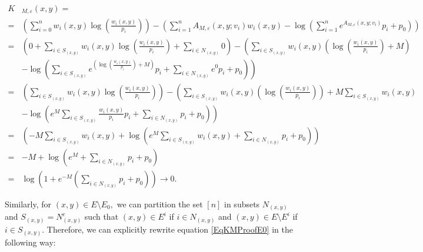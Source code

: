 \documentclass[12pt,twoside,a4paper]{article}
\newcommand{\lep}{\left(}
\newcommand{\rip}{\right)}
\begin{document}
\begin{align*}
    K&_{M,\varepsilon}(x,y)=\\
    =&\left(\sum^n_{i=0} w_i(x,y) \log \left(\frac{w_i(x,y)}{p_i}\right)\right) -\left(\sum^n_{i=1}A_{M,\varepsilon}(x,y;v_i)w_i(x,y)-\log\lep\sum^n_{i=1}e^{A_{M,\varepsilon}(x,y;v_i)}p_i+p_0\rip\right)\\
 =&\left(0+\sum_{i\in S_{(x,y)}}w_i(x,y) \log \left(\frac{w_i(x,y)}{p_i}\right)+\sum_{i\in N_{(x,y)}}0\right)-\left(\sum_{i\in S_{(x,y)}}w_i(x,y) \left(\log \left(\frac{w_i(x,y)}{p_i}\right)+M\right)\right.\\
    &\left. -\log\lep\sum_{i\in S_{(x,y)}}e^{\left(\log \left(\frac{w_i(x,y)}{p_i}\right)+M\right)}p_i+\sum_{i\in N_{(x,y)}}e^0p_i+p_0\rip\right)\\
 =&\left(\sum_{i\in S_{(x,y)}}w_i(x,y) \log \left(\frac{w_i(x,y)}{p_i}\right)\right) -\left(\sum_{i\in S_{(x,y)}}w_i(x,y) \left(\log \left(\frac{w_i(x,y)}{p_i}\right)\right)+M\sum_{i\in S_{(x,y)}}w_i(x,y)\right.\\
    &-\left.\log(e^M\sum_{i\in S_{(x,y)}}\frac{w_i(x,y)}{p_i}p_i+\sum_{i\in N_{(x,y)}}p_i+p_0)\right)\\
    =&\left(-M\sum_{i\in S_{(x,y)}}w_i(x,y) +\log\lep e^{M}\sum_{i\in S_{(x,y)}}w_i(x,y)+\sum_{i\in N_{(x,y)}}p_i+p_0\rip\right)\\
    =&-M +\log\lep e^{M}+\sum_{i\in N_{(x,y)}}p_i+p_0\rip\\
    =&\log\left(1+e^{-M}(\sum_{i\in N_{(x,y)}}p_i+p_0)\right)\longrightarrow 0.
\end{align*}


Similarly, for $(x,y) \in  E\setminus E_0,$ we can partition the set $ [n]$ in subsets $N_{(x,y)}$ and $S_{(x,y)}=N^c_{(x,y)}$ such that $(x,y) \in E^i$ if $i\in N_{(x,y)}$ and $(x,y) \in E\setminus E^i$ if $i\in S_{(x,y)}.$ Therefore, we can explicitly rewrite equation \eqref{EqKMProofE0} in the following way:
\end{document}
